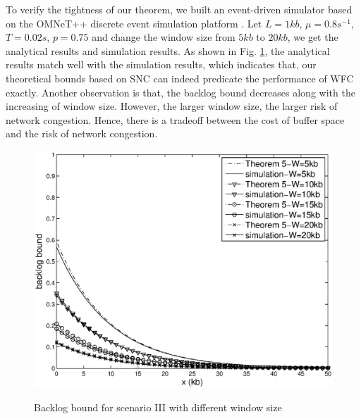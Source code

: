 \documentclass[12pt]{article}
\begin{document}
To verify the tightness of our theorem, we built an event-driven simulator based on the OMNeT++ discrete event simulation platform \cite{omnetpp}. Let $L=1kb$, $\mu=0.8s^{-1}$, $T=0.02s$, $p=0.75$ and change the window size from $5kb$ to $20kb$, we get the analytical results and simulation results. As shown in Fig. \ref{result1}, the analytical results match well with the simulation results, which indicates that, our theoretical bounds based on SNC can indeed predicate the performance of WFC exactly. Another observation is that, the backlog bound decreases along with the increasing of window size. However, the larger window size, the larger risk of network congestion. Hence, there is a tradeoff between the cost of buffer space and the risk of network congestion.
\begin{figure}
  \centering
  \includegraphics[scale=0.45]{figures/backlogbuf.eps}\\
  \caption{Backlog bound for scenario III with different window size}\label{result1}
\end{figure}
\end{document}

